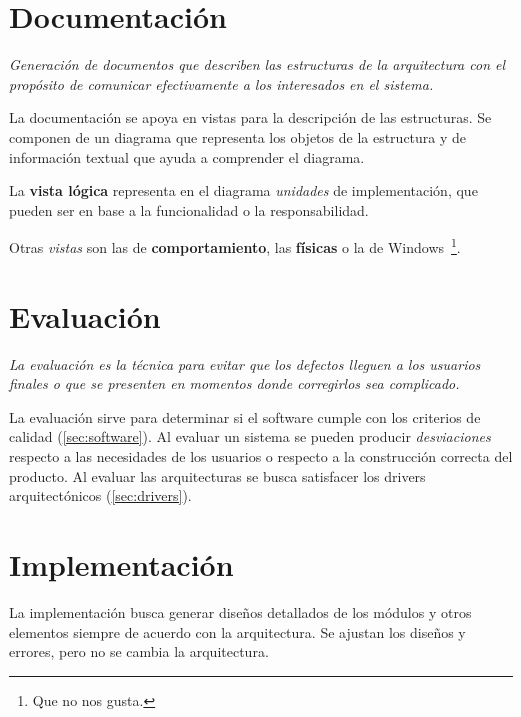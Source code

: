 \section{Documentación}
\label{sec:documentacion}

\begin{center}
  \textit{Generación de documentos que describen las estructuras de la
  arquitectura con el propósito de comunicar efectivamente a los
  interesados en el sistema.}
\end{center}

La documentación se apoya en vistas para la descripción de las
estructuras. Se componen de un diagrama que representa los objetos de
la estructura y de información textual que ayuda a comprender el
diagrama.

La \textbf{vista lógica} representa en el diagrama
\emph{unidades} de implementación, que pueden ser en base a la
funcionalidad o la responsabilidad.

Otras \emph{vistas} son las de \textbf{comportamiento}, las \textbf{físicas}
o la de Windows\texttrademark~\footnote{Que no nos gusta.}.

\section{Evaluación}
\label{sec:arquitectura:evaluacion}

\begin{center}
  \textit{La evaluación es la técnica para evitar que los defectos lleguen a
  los usuarios finales o que se presenten en momentos donde
  corregirlos sea complicado.}
\end{center}

La evaluación sirve para determinar si el software cumple con los
criterios de calidad (\ref{sec:software}). Al evaluar un sistema se
pueden producir \emph{desviaciones} respecto a las necesidades de los
usuarios o respecto a la construcción correcta del producto. Al
evaluar las arquitecturas se busca satisfacer los drivers
arquitectónicos (\ref{sec:drivers}).

\section{Implementación}
\label{sec:implementacion}

La implementación busca generar diseños detallados de los módulos y
otros elementos siempre de acuerdo con la arquitectura. Se ajustan los
diseños y errores, pero no se cambia la arquitectura.

